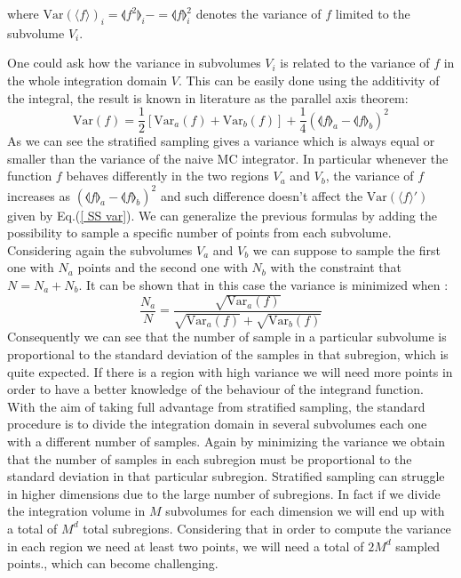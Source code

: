 \documentclass[../main/main.tex]{subfiles}
\begin{document}
where $\text{Var}(\langle f \rangle)_{i} = \llangle f^2 \rrangle_i - = \llangle f \rrangle^2_i$ denotes the variance of $f$ limited to the subvolume $V_i$.

One could ask how the variance in subvolumes $V_i$ is related to the variance of $f$ in the whole integration domain $V$. This can be easily done using the additivity of the integral, the result is known in literature as the parallel axis theorem:
\begin{equation}
	\text{Var}(f) = \frac{1}{2} [ \text{Var}_a(f) + \text{Var}_b(f)] + \frac{1}{4} ( 
	\llangle f \rrangle_a - \llangle f \rrangle_b)^2
\end{equation}
As we can see the stratified sampling gives a variance which is always equal or smaller than the variance of the naive MC integrator. In particular whenever the function $f$ behaves differently in 
the two regions $V_a$ and $V_b$, the variance of $f$ increases as $ ( 
\llangle f \rrangle_a - \llangle f \rrangle_b)^2$ and such difference doesn't affect the $\text{Var}(\langle f \rangle')$ given by Eq.(\ref{ SS var}).
\newline
We can generalize the previous formulas by adding the possibility to sample a specific number of 
points from each subvolume. Considering again the subvolumes $V_a$ and $V_b$ we can suppose 
to sample the first one with $N_a$ points and the second one with $N_b$ with the constraint that $N = N_a + N_b$. 
\newline
It can be shown that in this case the variance is minimized when \cite{Press:1989vk}:
\begin{equation}
	\frac{N_a}{N} = \frac{\sqrt{\text{Var}_a(f)}}{\sqrt{\text{Var}_a(f)}+
		\sqrt{\text{Var}_b(f)}}
\end{equation}
Consequently we can see that the number of sample in a particular subvolume is proportional to the standard deviation of the samples in that subregion, which is quite expected. If there is a region with high variance we will need more points in order to have a better knowledge of the behaviour of the 
integrand function.
\newline
With the aim of taking full advantage from stratified sampling, the standard procedure is to divide
the integration domain in several subvolumes each one with a different number of samples. Again by minimizing the variance we obtain that the number of samples in each subregion must be proportional
to the standard deviation in that particular subregion.
\newline
Stratified sampling can struggle in higher dimensions due to the large number of subregions.
In fact if we divide the integration volume in $M$ subvolumes for each dimension we will end up with a total of $M^d$  total subregions. Considering that in order to compute the variance in each region we need at least two points, we will need a total of $2 M^d$ sampled points., which can become challenging.
\end{document}
